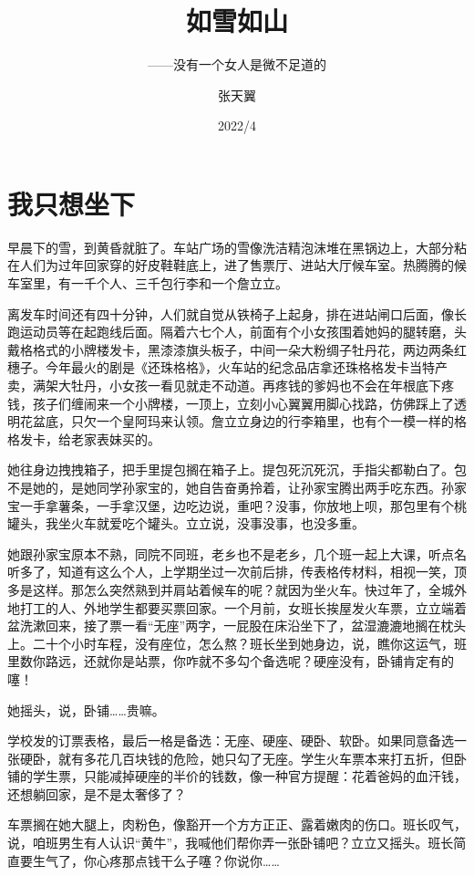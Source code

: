 \documentclass[lang=cn,newtx,12pt,scheme=chinese]{elegantbook}
\title{如雪如山}
\subtitle{——没有一个女人是微不足道的}
\author{张天翼}
\institute{tracingabook}
\date{2022/4}
\begin{document}
\maketitle
\frontmatter

\tableofcontents

\mainmatter

\chapter{我只想坐下}
早晨下的雪，到黄昏就脏了。车站广场的雪像洗洁精泡沫堆在黑锅边上，大部分粘在人们为过年回家穿的好皮鞋鞋底上，进了售票厅、进站大厅候车室。热腾腾的候车室里，有一千个人、三千包行李和一个詹立立。

离发车时间还有四十分钟，人们就自觉从铁椅子上起身，排在进站闸口后面，像长跑运动员等在起跑线后面。隔着六七个人，前面有个小女孩围着她妈的腿转磨，头戴格格式的小牌楼发卡，黑漆漆旗头板子，中间一朵大粉绸子牡丹花，两边两条红穗子。今年最火的剧是《还珠格格》，火车站的纪念品店拿还珠格格发卡当特产卖，满架大牡丹，小女孩一看见就走不动道。再疼钱的爹妈也不会在年根底下疼钱，孩子们缠闹来一个小牌楼，一顶上，立刻小心翼翼用脚心找路，仿佛踩上了透明花盆底，只欠一个皇阿玛来认领。詹立立身边的行李箱里，也有个一模一样的格格发卡，给老家表妹买的。

她往身边拽拽箱子，把手里提包搁在箱子上。提包死沉死沉，手指尖都勒白了。包不是她的，是她同学孙家宝的，她自告奋勇拎着，让孙家宝腾出两手吃东西。孙家宝一手拿薯条，一手拿汉堡，边吃边说，重吧？没事，你放地上呗，那包里有个桃罐头，我坐火车就爱吃个罐头。立立说，没事没事，也没多重。

她跟孙家宝原本不熟，同院不同班，老乡也不是老乡，几个班一起上大课，听点名听多了，知道有这么个人，上学期坐过一次前后排，传表格传材料，相视一笑，顶多是这样。那怎么突然熟到并肩站着候车的呢？就因为坐火车。快过年了，全城外地打工的人、外地学生都要买票回家。一个月前，女班长挨屋发火车票，立立端着盆洗漱回来，接了票一看“无座”两字，一屁股在床沿坐下了，盆湿漉漉地搁在枕头上。二十个小时车程，没有座位，怎么熬？班长坐到她身边，说，瞧你这运气，班里数你路远，还就你是站票，你咋就不多勾个备选呢？硬座没有，卧铺肯定有的噻！

她摇头，说，卧铺……贵嘛。

学校发的订票表格，最后一格是备选：无座、硬座、硬卧、软卧。如果同意备选一张硬卧，就有多花几百块钱的危险，她只勾了无座。学生火车票本来打五折，但卧铺的学生票，只能减掉硬座的半价的钱数，像一种官方提醒：花着爸妈的血汗钱，还想躺回家，是不是太奢侈了？

车票搁在她大腿上，肉粉色，像豁开一个方方正正、露着嫩肉的伤口。班长叹气，说，咱班男生有人认识“黄牛”，我喊他们帮你弄一张卧铺吧？立立又摇头。班长简直要生气了，你心疼那点钱干么子噻？你说你……
\end{document}
